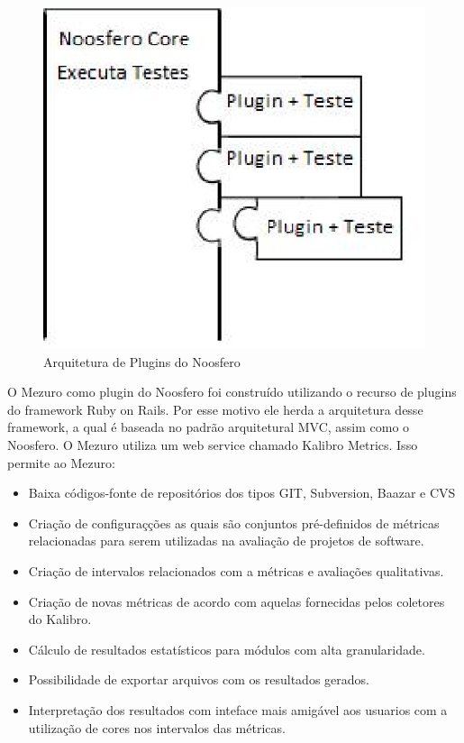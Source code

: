 \graphicspath{{figuras/}}
\begin{figure}[!htb]
\centering
\includegraphics{plugins}
\caption{Arquitetura de Plugins do Noosfero}
\label{Rotulo}
\end{figure}

O Mezuro como plugin do Noosfero foi construído utilizando o recurso de plugins do framework Ruby on Rails. Por esse motivo ele herda a arquitetura desse framework, a qual é baseada no padrão arquitetural MVC, assim como o Noosfero.
O Mezuro utiliza um web service chamado Kalibro Metrics. Isso permite ao Mezuro: 

\begin{itemize}
\item Baixa códigos-fonte de repositórios dos tipos GIT, Subversion, Baazar e CVS
\item Criação de configuraçções as quais são conjuntos pré-definidos de métricas relacionadas para serem utilizadas na avaliação de projetos de software.
\item Criação de intervalos relacionados com a métricas e avaliações qualitativas.
\item Criação de novas métricas de acordo com aquelas fornecidas pelos coletores do Kalibro.
\item Cálculo de resultados estatísticos para módulos com alta granularidade.
\item Possibilidade de exportar arquivos com os resultados gerados.
\item Interpretação dos resultados com inteface mais amigável aos usuarios com a utilização de cores nos intervalos das métricas.
\end{itemize}



